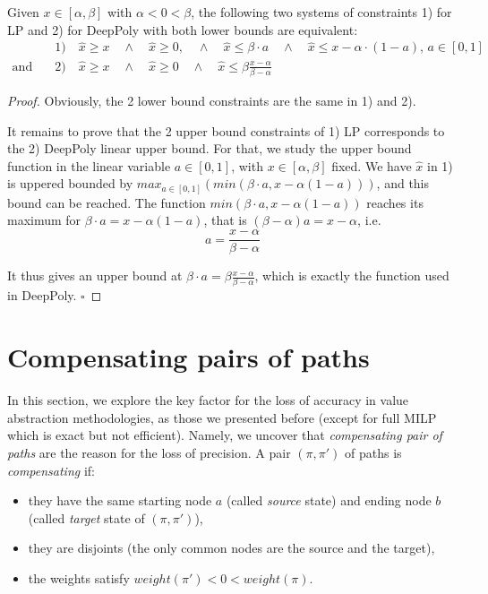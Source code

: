 \documentclass{llncs}
\begin{document}
\begin{proposition}
	\label{LP}
 Given $x \in [\alpha,\beta]$ with $\alpha < 0 < \beta$, the following two systems of constraints 
 1) for LP and 2) for DeepPoly with both lower bounds are equivalent:
 \vspace{-0.3cm}
 \begin{align*}
	 & 1) \quad \hat{x} \geq x \quad \wedge \quad \hat{x} \geq 0, \quad \wedge \quad \hat{x} \leq \beta \cdot a \quad \wedge \quad \hat{x} \leq x-\alpha \cdot (1-a), \, a \in [0,1] \\
	 \text{and} \quad  & 2)  \quad \hat{x} \geq x \quad \wedge \quad \hat{x} \geq 0 \quad \wedge \quad \hat{x} \leq \beta \frac{x-\alpha}{\beta-\alpha}
\end{align*} 
\end{proposition}

\begin{proof}
Obviously, the 2 lower bound constraints are the same in 1) and 2).

It remains to prove that the 2 upper bound constraints of 1) LP corresponds to the 2) DeepPoly linear upper bound. For that, we study the upper bound function in the linear variable $a \in  [0,1]$, with $x \in [\alpha,\beta]$ fixed. We have $\hat{x}$ in 1) is uppered bounded by $max_{a \in [0,1]} (min(\beta \cdot a, x - \alpha (1-a)))$, and this bound can be reached. 
The function $min(\beta \cdot a, x - \alpha (1-a))$ reaches its maximum for 
$\beta \cdot a = x - \alpha (1-a)$, that is 
$(\beta - \alpha) a = x - \alpha$, i.e. 
$$ a = \frac{x - \alpha}{\beta-\alpha}$$

It thus gives an upper bound at 
$\beta \cdot a = \beta \frac{x - \alpha}{\beta-\alpha}$, which is exactly the function used in DeepPoly.
\hfill $\square$
\end{proof}







\section{Compensating pairs of paths}
\label{Sec.comp}

In this section, we explore the key factor for the loss of accuracy in value abstraction methodologies, as those we presented before (except for full MILP which is exact but 
not efficient). 
Namely, we uncover that \emph{compensating pair of paths} are the reason for the loss of precision. A pair $(\pi,\pi')$ of paths is {\em compensating} if:
\begin{itemize}
 \item they have the same starting node $a$ (called {\em source} state) and ending node $b$ (called {\em target} state of $(\pi,\pi')$),
 \item they are disjoints (the only common nodes are the source and the target),
 \item the weights satisfy $weight(\pi') < 0 < weight(\pi)$.
\end{itemize}
\end{document}
